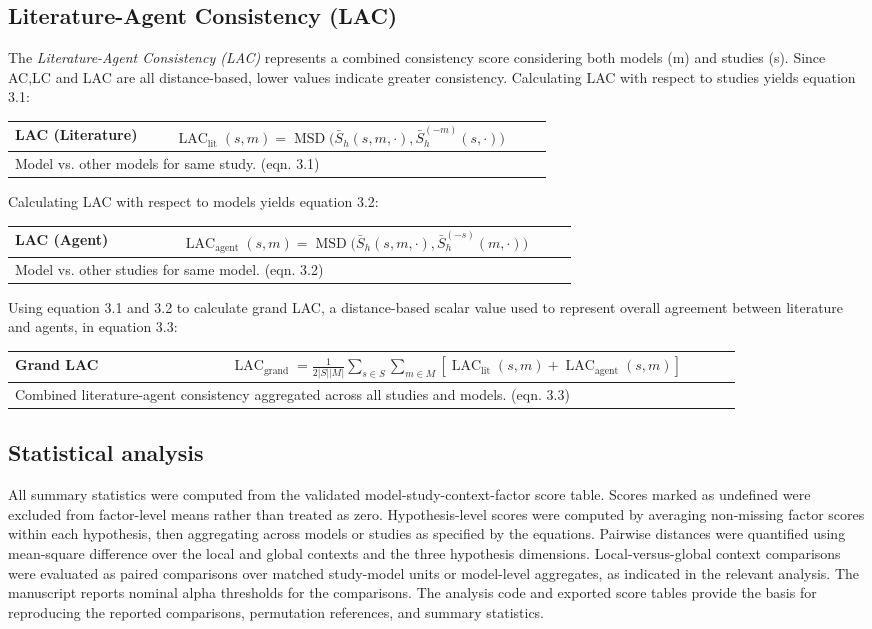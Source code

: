 \documentclass[12pt]{article}
\renewcommand{\arraystretch}{1.06}
\newcommand{\EquationBox}[3]{%
  \begin{center}
  \begingroup
  \small
  \setlength{\tabcolsep}{6pt}%
  \renewcommand{\arraystretch}{1.18}%
  \begin{tabular}{|p{0.27\linewidth}|p{0.64\linewidth}|}
  \hline
  \textbf{#1} & #2 \\
  \hline
  \multicolumn{2}{|p{0.94\linewidth}|}{#3} \\
  \hline
  \end{tabular}
  \endgroup
  \end{center}
}
\begin{document}
\subsection{Literature-Agent Consistency (LAC)}\label{literature-agent-consistency-lac}

The \emph{Literature-Agent Consistency (LAC)} represents a combined consistency score considering both models (m) and studies (s). Since AC,LC and LAC are all distance-based, lower values indicate greater consistency. Calculating LAC with respect to studies yields equation 3.1:
\EquationBox{LAC (Literature)}{\(\displaystyle \operatorname{LAC}_{\mathrm{lit}}(s,m)=\operatorname{MSD}\bigl(\bar{S}_h(s,m,\cdot),\bar{S}_h^{(-m)}(s,\cdot)\bigr)\)}{Model vs. other models for same study. (eqn. 3.1)}
Calculating LAC with respect to models yields equation 3.2:
\EquationBox{LAC (Agent)}{\(\displaystyle \operatorname{LAC}_{\mathrm{agent}}(s,m)=\operatorname{MSD}\bigl(\bar{S}_h(s,m,\cdot),\bar{S}_h^{(-s)}(m,\cdot)\bigr)\)}{Model vs. other studies for same model. (eqn. 3.2)}
Using equation 3.1 and 3.2 to calculate grand LAC, a distance-based scalar value used to represent overall agreement between literature and agents, in equation 3.3:
\EquationBox{Grand LAC}{\(\displaystyle \operatorname{LAC}_{\mathrm{grand}}=\frac{1}{2|S||M|}\sum_{s\in S}\sum_{m\in M}\left[\operatorname{LAC}_{\mathrm{lit}}(s,m)+\operatorname{LAC}_{\mathrm{agent}}(s,m)\right]\)}{Combined literature-agent consistency aggregated across all studies and models. (eqn. 3.3)}


\subsection{Statistical analysis}\label{statistical-analysis}
All summary statistics were computed from the validated model-study-context-factor score table. Scores marked as undefined were excluded from factor-level means rather than treated as zero. Hypothesis-level scores were computed by averaging non-missing factor scores within each hypothesis, then aggregating across models or studies as specified by the equations. Pairwise distances were quantified using mean-square difference over the local and global contexts and the three hypothesis dimensions. Local-versus-global context comparisons were evaluated as paired comparisons over matched study-model units or model-level aggregates, as indicated in the relevant analysis. The manuscript reports nominal alpha thresholds for the comparisons. The analysis code and exported score tables provide the basis for reproducing the reported comparisons, permutation references, and summary statistics.
\end{document}
